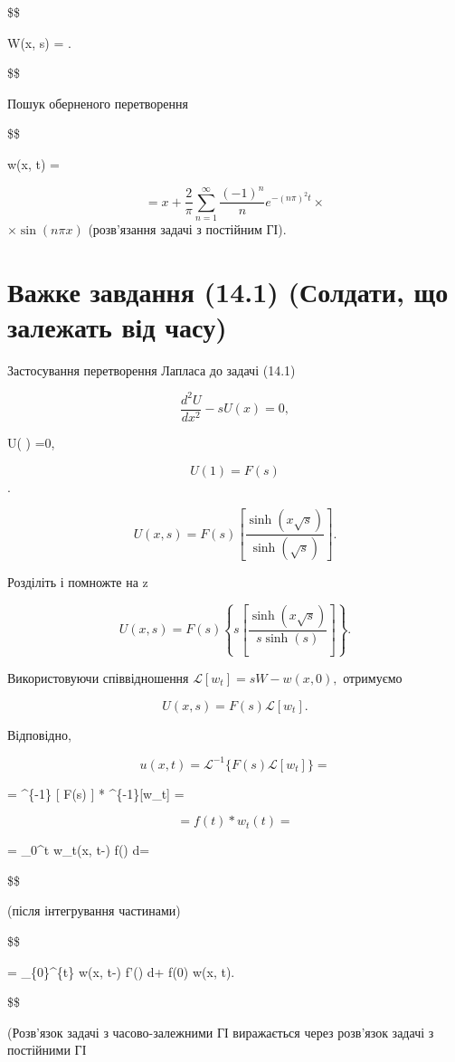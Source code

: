 \documentclass[
  ukrainian,
]{article}
\begin{document}
\$\$

W(x, s) = 
.

\$\$

Пошук оберненого перетворення

\$\$

w(x, t) =

\[ = x + \frac{2}{\pi} \sum_{n=1}^{\infty} \frac{(-1)^n}{n} e^{-(n\pi)^2 t} \times\]
\(\times \sin(n\pi x)\) (розв'язання задачі з постійним ГІ).

\section{Важке завдання (14.1) (Солдати, що залежать від
часу)}\label{ux432ux430ux436ux43aux435-ux437ux430ux432ux434ux430ux43dux43dux44f-14.1-ux441ux43eux43bux434ux430ux442ux438-ux449ux43e-ux437ux430ux43bux435ux436ux430ux442ux44c-ux432ux456ux434-ux447ux430ux441ux443}

Застосування перетворення Лапласа до задачі (14.1)

\[\frac{d^2U}{dx^2} - sU(x) = 0,\]

U\left( \right) =0,

\[ U(1) = F(s)\].

\[U(x, s) = F(s) \left[ \frac{\sinh(x \sqrt{s})}{\sinh(\sqrt{s})} \right].\]

Розділіть і помножте на z

\[U(x, s) = F(s) \left\{ s \left[ \frac{\sinh(x \sqrt{s})}{s \sinh(s)} \right] \right\}.\]

Використовуючи співвідношення \(\mathscr{L}[w_t] = sW - w(x, 0),\)
отримуємо

\[U(x, s) = F(s) \mathcal{L}[w_t].\]

Відповідно,

\[u(x, t) = \mathcal{L}^{-1} \{ F(s) \mathcal{L}[w_t] \} =\]

= \^{}\{-1\} {[} F(s) {]} * \^{}\{-1\}{[}w\_t{]} =

\[ = f(t) * w_t(t) =\]

= \int\_0\^{}t w\_t(x, t-\tau) f(\tau) d\tau =

\$\$

(після інтегрування частинами)

\$\$

= \int\_\{0\}\^{}\{t\} w(x, t-\tau) f'(\tau) d\tau + f(0) w(x, t).

\$\$

(Розв'язок задачі з часово-залежними ГІ виражається через розв'язок
задачі з постійними ГІ
\end{document}
